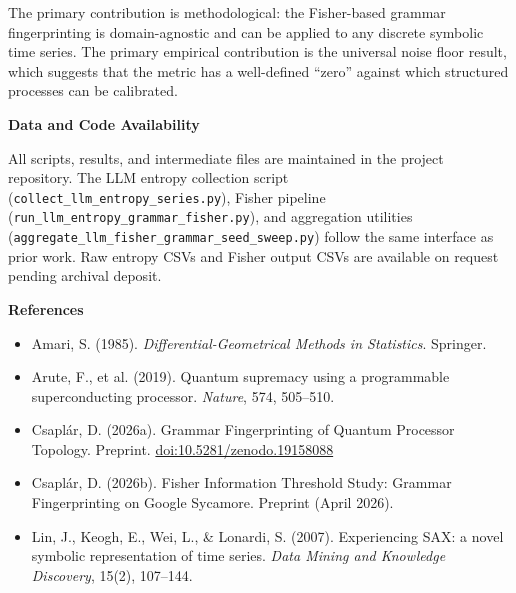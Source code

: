 \documentclass[11pt,a4paper]{article}
\begin{document}
The primary contribution is methodological: the Fisher-based grammar fingerprinting is domain-agnostic and can be applied to any discrete symbolic time series. The primary empirical contribution is the universal noise floor result, which suggests that the metric has a well-defined ``zero'' against which structured processes can be calibrated.

\vspace{0.6em}
\noindent\textbf{Data and Code Availability}

All scripts, results, and intermediate files are maintained in the project repository. The LLM entropy collection script (\texttt{collect\_llm\_entropy\_series.py}), Fisher pipeline (\texttt{run\_llm\_entropy\_grammar\_fisher.py}), and aggregation utilities (\texttt{aggregate\_llm\_fisher\_grammar\_seed\_sweep.py}) follow the same interface as prior work. Raw entropy CSVs and Fisher output CSVs are available on request pending archival deposit.

\vspace{0.6em}
\noindent\textbf{References}

\begin{itemize}\setlength\itemsep{0.2em}
\item Amari, S. (1985). \textit{Differential-Geometrical Methods in Statistics}. Springer.
\item Arute, F., et al. (2019). Quantum supremacy using a programmable superconducting processor. \textit{Nature}, 574, 505--510.
\item Csapl\'ar, D. (2026a). Grammar Fingerprinting of Quantum Processor Topology. Preprint. \href{https://doi.org/10.5281/zenodo.19158088}{doi:10.5281/zenodo.19158088}
\item Csapl\'ar, D. (2026b). Fisher Information Threshold Study: Grammar Fingerprinting on Google Sycamore. Preprint (April 2026).
\item Lin, J., Keogh, E., Wei, L., \& Lonardi, S. (2007). Experiencing SAX: a novel symbolic representation of time series. \textit{Data Mining and Knowledge Discovery}, 15(2), 107--144.
\end{itemize}
\end{document}
